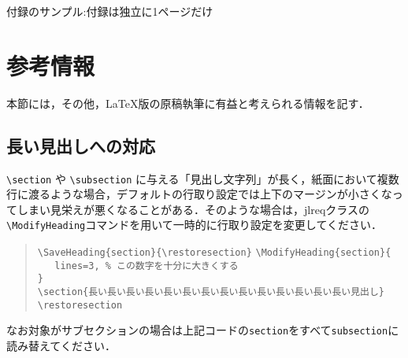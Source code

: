 \documentclass[
  platex, dvipdfmx,  %
]{nlp2024}
\newcommand{\code}[1]{\texttt{#1}}
\begin{document}




\clearpage
\appendix
{付録のサンプル:付録は独立に1ページだけ}
\section{参考情報}
本節には，その他，LaTeX版の原稿執筆に有益と考えられる情報を記す．


\subsection{長い見出しへの対応}
\verb|\section|
や
\verb|\subsection|
に与える「見出し文字列」が長く，紙面において複数行に渡るような場合，デフォルトの行取り設定では上下のマージンが小さくなってしまい見栄えが悪くなることがある．そのような場合は，jlreqクラスの \verb|\ModifyHeading|コマンドを用いて一時的に行取り設定を変更してください．

\begin{quote}
\verb|\SaveHeading{section}{\restoresection}|
\verb|\ModifyHeading{section}{|\\
\verb|   lines=3, % この数字を十分に大きくする|\\
\verb|}|\\
\verb|\section{長い長い長い長い長い長い長い長い長い長い長い長い長い長い見出し}|\\
\verb|\restoresection|
\end{quote}

なお対象がサブセクションの場合は上記コードの\code{section}をすべて\code{subsection}に読み替えてください．
\end{document}

